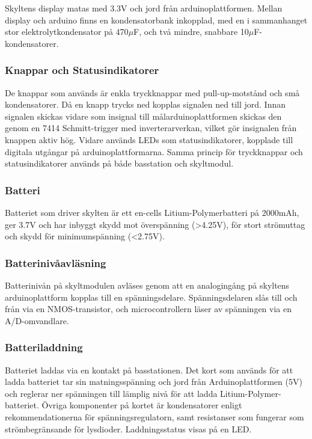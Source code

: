 \documentclass[a4paper,11pt]{article}
\begin{document}
Skyltens display matas med 3.3V och jord från arduinoplattformen. Mellan display och arduino finns en kondensatorbank inkopplad, med en i sammanhanget stor elektrolytkondensator på 470$\mu$F, och två mindre, snabbare 10$\mu$F-kondensatorer. 

\subsubsection{Knappar och Statusindikatorer}
De knappar som används är enkla tryckknappar med pull-up-motstånd och små kondensatorer. Då en knapp trycks ned kopplas signalen ned till jord. Innan signalen skickas vidare som insignal till målarduinoplattformen skickas den genom en 7414 Schmitt-trigger med inverterarverkan, vilket gör insignalen från knappen aktiv hög. Vidare används LEDs som statusindikatorer, kopplade till digitala utgångar på arduinoplattformarna. Samma princip för tryckknappar och statusindikatorer används på både basstation och skyltmodul.

\subsubsection{Batteri}
Batteriet som driver skylten är ett en-cells Litium-Polymerbatteri på 2000mAh, ger 3.7V och har inbyggt skydd mot överspänning (>4.25V), för stort strömuttag och skydd för minimumspänning (<2.75V).

\subsubsection{Batterinivåavläsning}
Batterinivån på skyltmodulen avläses genom att en analogingång på skyltens arduinoplattform kopplas till en spänningsdelare. Spänningsdelaren slås till och från via en NMOS-transistor, och microcontrollern läser av spänningen via en A/D-omvandlare.

\subsubsection{Batteriladdning}
Batteriet laddas via en kontakt på basstationen. Det kort som används för att ladda batteriet tar sin matningsspänning och jord från Arduinoplattformen (5V) och reglerar ner spänningen till lämplig nivå för att ladda Litium-Polymer-batteriet. Övriga komponenter på kortet är kondensatorer enligt rekommendationerna för spänningsregulatorn, samt resistanser som fungerar som strömbegränsande för lysdioder. Laddningsstatus visas på en LED.
\end{document}
